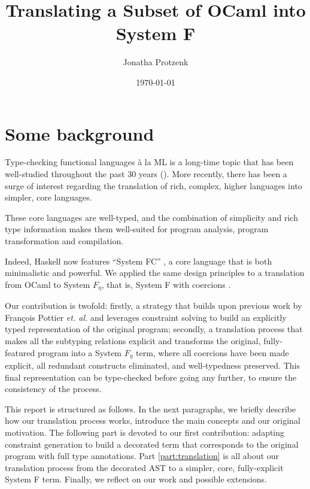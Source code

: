 \documentclass[10pt,a4paper,twoside,titlepage,twocolumn]{article}
\title{Translating a Subset of OCaml into System F}
\author{Jonatha\wf{n} Protzenk\wf{o}}
\date{\today}
\begin{document}
{
\maketitle}
\tableofcontents

\part{Some background}

Type-checking functional languages à la ML is a long-time topic that has been
well-studied throughout the past 30 years
(\cite{gordon1978metalanguage,damas1982principal}). More
recently, there has been a surge of interest regarding the translation of rich,
complex, higher languages into simpler, core languages.

These core languages are well-typed, and the combination of simplicity and rich
type information makes them well-suited for program analysis, program
transformation and compilation.

Indeed, Haskell now features ``System FC'' \cite{sulzmann2007system}, a core
language that is both minimalistic and powerful. We applied the same design
principles to a translation from OCaml \cite{ocaml} to System $F_{\eta}$, that
is, System F with coercions \cite{mitchell-88}.

Our contribution is twofold: firstly, a strategy that builds upon previous work by
François Pottier \emph{et. al.} \cite{pottier2005essence} and leverages
constraint solving to build an explicitly typed representation of the original
program; secondly, a translation process that makes all the subtyping
relations explicit and transforms the original, fully-featured program into a System
$F_{\eta}$ term, where all coercions have been made explicit, all redundant
constructs eliminated, and well-typedness preserved. This final representation
can be type-checked before going any further, to ensure the consistency of the
process.

This report is structured as follows. In the next paragraphs, we briefly
describe how our translation process works, introduce the main concepts and our
original motivation. The following part is devoted to our first contribution:
adapting constraint generation to build a decorated term that corresponds to the
original program with full type annotations. Part \ref{part:translation} is all
about our translation process from the decorated AST to a simpler, core,
fully-explicit System F term. Finally, we reflect on our work and possible
extensions.
\end{document}
